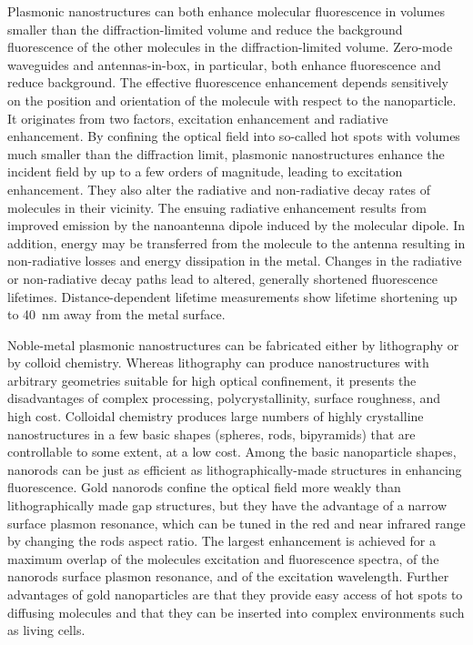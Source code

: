 Plasmonic nanostructures can both enhance molecular fluorescence in volumes smaller than the diffraction-limited volume and reduce the background fluorescence of the other molecules in the diffraction-limited volume.
Zero-mode waveguides and antennas-in-box, in particular, both enhance fluorescence and reduce background.\cite{levene2003zeromode,kinkhabwala2012fluorescence,punj2013a,yuan2013thousandfold,punj2013gold} 
The effective fluorescence enhancement depends sensitively on the position and orientation of the molecule with respect to the nanoparticle.
It originates from two factors, excitation enhancement and radiative enhancement.
By confining the optical field into so-called hot spots with volumes much smaller than the diffraction limit,\cite{schuller2010plasmonics} plasmonic nanostructures enhance the incident field by up to a few orders of magnitude, leading to excitation enhancement.\cite{yuan2013thousandfold,anger2006enhancement,kinkhabwala2009large,
acuna2012fluorescence,busson2012accelerated,holzmeister2014quantum,khatua2014resonant}
They also alter the radiative and non-radiative decay rates of molecules in their vicinity.
The ensuing radiative enhancement results from improved emission by the nanoantenna dipole induced by the molecular dipole.
In addition, energy may be transferred from the molecule to the antenna resulting in non-radiative losses and energy dissipation in the metal.
Changes in the radiative or non-radiative decay paths lead to altered, generally shortened fluorescence lifetimes.\cite{khatua2014resonant,liu2007quantized,lakowicz2001radiative,dulkeith2005gold,seelig2007nanoparticleinduced,muskens2007strong,pelton2015modified}
Distance-dependent lifetime measurements show lifetime shortening up to \SI{40}{\nm} away from the metal surface.\cite{seelig2007nanoparticleinduced}


Noble-metal plasmonic nanostructures can be fabricated either by lithography or by colloid chemistry.\cite{zijlstra2011single}
Whereas lithography can produce nanostructures with arbitrary geometries suitable for high optical confinement, it presents the disadvantages of complex processing, polycrystallinity, surface roughness, and high cost.
Colloidal chemistry produces large numbers of highly crystalline nanostructures in a few basic shapes (spheres, rods, bipyramids) that are controllable to some extent, at a low cost. 
Among the basic nanoparticle shapes, nanorods\cite{yuan2013thousandfold} can be just as efficient as lithographically-made structures\cite{punj2013a,kinkhabwala2009large} in enhancing fluorescence.
Gold nanorods confine the optical field more weakly than lithographically made gap structures, but they have the advantage of a narrow surface plasmon resonance, which can be tuned in the red and near infrared range by changing the rod\textquotesingle s aspect ratio.\cite{khatua2014resonant}
The largest enhancement is achieved for a maximum overlap of the molecule\textquotesingle s excitation and fluorescence spectra, of the nanorod\textquotesingle s surface plasmon resonance, and of the excitation wavelength.
Further advantages of gold nanoparticles are that they provide easy access of hot spots to diffusing molecules and that they can be inserted into complex environments such as living cells.


